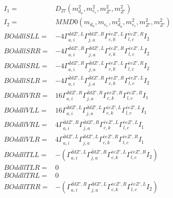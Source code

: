 \documentclass[A4,landscape]{article}
\begin{document}
\begin{align} 
I_1 = & D_{27}(m^2_{d_{{a}}}, m^2_{e_{{c}}}, m^2_{{Z'}}, m^2_{{Z'}}) \\ 
I_2 = & MMD0(m_{d_{{a}}}, m_{e_{{c}}}, m^2_{d_{{a}}}, m^2_{e_{{c}}}, m^2_{{Z'}}, m^2_{{Z'}}) \\ 
  BOddllSLL= & -4  \Gamma^{\bar{d}d {Z'} ,L}_{a, i} \Gamma^{\bar{d}d {Z'} ,R}_{j, a} \Gamma^{\bar{e}e {Z'} ,L}_{c, k} \Gamma^{\bar{e}e {Z'} ,R}_{l, c} I_2 \\ 
  BOddllSRR= & -4  \Gamma^{\bar{d}d {Z'} ,R}_{a, i} \Gamma^{\bar{d}d {Z'} ,L}_{j, a} \Gamma^{\bar{e}e {Z'} ,R}_{c, k} \Gamma^{\bar{e}e {Z'} ,L}_{l, c} I_2 \\ 
  BOddllSRL= & -4  \Gamma^{\bar{d}d {Z'} ,R}_{a, i} \Gamma^{\bar{d}d {Z'} ,L}_{j, a} \Gamma^{\bar{e}e {Z'} ,L}_{c, k} \Gamma^{\bar{e}e {Z'} ,R}_{l, c} I_2 \\ 
  BOddllSLR= & -4  \Gamma^{\bar{d}d {Z'} ,L}_{a, i} \Gamma^{\bar{d}d {Z'} ,R}_{j, a} \Gamma^{\bar{e}e {Z'} ,R}_{c, k} \Gamma^{\bar{e}e {Z'} ,L}_{l, c} I_2 \\ 
  BOddllVRR= & 16  \Gamma^{\bar{d}d {Z'} ,R}_{a, i} \Gamma^{\bar{d}d {Z'} ,R}_{j, a} \Gamma^{\bar{e}e {Z'} ,R}_{c, k} \Gamma^{\bar{e}e {Z'} ,R}_{l, c} I_1 \\ 
  BOddllVLL= & 16  \Gamma^{\bar{d}d {Z'} ,L}_{a, i} \Gamma^{\bar{d}d {Z'} ,L}_{j, a} \Gamma^{\bar{e}e {Z'} ,L}_{c, k} \Gamma^{\bar{e}e {Z'} ,L}_{l, c} I_1 \\ 
  BOddllVRL= & 4  \Gamma^{\bar{d}d {Z'} ,R}_{a, i} \Gamma^{\bar{d}d {Z'} ,R}_{j, a} \Gamma^{\bar{e}e {Z'} ,L}_{c, k} \Gamma^{\bar{e}e {Z'} ,L}_{l, c} I_1 \\ 
  BOddllVLR= & 4  \Gamma^{\bar{d}d {Z'} ,L}_{a, i} \Gamma^{\bar{d}d {Z'} ,L}_{j, a} \Gamma^{\bar{e}e {Z'} ,R}_{c, k} \Gamma^{\bar{e}e {Z'} ,R}_{l, c} I_1 \\ 
  BOddllTLL= & -( \Gamma^{\bar{d}d {Z'} ,L}_{a, i} \Gamma^{\bar{d}d {Z'} ,R}_{j, a} \Gamma^{\bar{e}e {Z'} ,L}_{c, k} \Gamma^{\bar{e}e {Z'} ,R}_{l, c} I_2) \\ 
  BOddllTLR= & 0 \\ 
  BOddllTRL= & 0 \\ 
  BOddllTRR= & -( \Gamma^{\bar{d}d {Z'} ,R}_{a, i} \Gamma^{\bar{d}d {Z'} ,L}_{j, a} \Gamma^{\bar{e}e {Z'} ,R}_{c, k} \Gamma^{\bar{e}e {Z'} ,L}_{l, c} I_2) \\ 
\end{align} 
\end{document}
